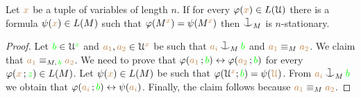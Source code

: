 \begin{proposition}
Let ${\color{brown} x}$ be a tuple of variables of length $n$.
If for every $\varphi({\color{brown} x})\in L(\EuScript U)$ there is a formula $\psi({\color{brown} x})\in L(M)$ such that $\varphi(M^{\color{brown} x})=\psi(M^{\color{brown} x})$ then $\cnonfork_M$ is $n$-stationary.
\end{proposition}

\begin{proof}
Let ${\color{green} b}\in\EuScript U^{\color{green} z}$ and ${\color{brown} a_1},{\color{brown} a_2}\in\EuScript U^{\color{brown} x}$ be such that ${\mr a_i}\cnonfork_M{\gr b}$ and ${\color{brown} a_1}\equiv_M{\color{brown} a_2}$.
We claim that ${\color{brown} a_1}\equiv_{M,\,{\color{green} b}}{\color{brown} a_2}$.
We need to prove that $\varphi({\color{brown} a_1}\,;{\color{green} b})\leftrightarrow\varphi({\color{brown} a_2}\,;{\color{green} b})$ for every  $\varphi({\color{brown} x}\,;{\color{green} z})\in L(M)$.
Let $\psi({\color{brown} x})\in L(M)$ be such that $\varphi(\EuScript U^{\color{brown} x};{\color{green} b})=\psi({\color{brown} \EuScript U})$.
From ${\mr a_i}\cnonfork_M{\gr b}$ we obtain that  $\varphi({\color{brown} a_i}\,;{\color{green} b})\leftrightarrow\psi({\color{brown} a_i})$.
Finally, the claim follows because ${\color{brown} a_1}\equiv_M{\color{brown} a_2}$.
\end{proof}



% 




